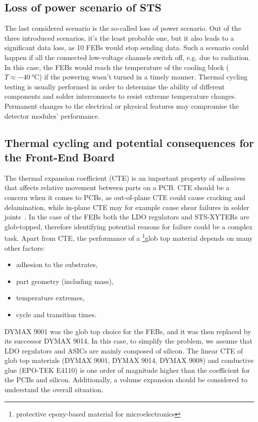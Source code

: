 \subsection{Loss of power scenario of STS}
\label{power_loss}
The last considered scenario is the so-called loss of power scenario. Out of the three introduced scenarios, it's the least probable one, but it also leads to a significant data loss, as 10 \glspl{FEB} would stop sending data. Such a scenario could happen if all the connected low-voltage channels switch off, e.g. due to radiation. In this case, the \glspl{FEB} would reach the temperature of the cooling block ($T \approx \SI{-40}{\celsius}$) if the powering wasn't turned in a timely manner.
Thermal cycling testing is usually performed in order to determine the ability of different components and solder interconnects to resist extreme temperature changes. Permanent changes to the electrical or physical features may compromise the detector modules' performance. 
\subsection{Thermal cycling and potential consequences for the Front-End Board}

The thermal expansion coefficient (\gls{CTE}) is an important property of adhesives that affects relative movement between parts on a \gls{PCB}. \gls{CTE} should be a concern when it comes to \glspl{PCB}, as out-of-plane \gls{CTE} could cause cracking and delamination, while in-plane \gls{CTE} may for example cause shear failures in solder joints~\cite{cte_report}. In the case of the \glspl{FEB} both the \gls{LDO} regulators and STS-XYTERs are glob-topped, therefore identifying potential reasons for failure could be a complex task. Apart from \gls{CTE}, the performance of a \footnote{protective epoxy-based material for microelectronics}{glob top} material depends on many other factors:
\begin{itemize}
    \item adhesion to the substrates,
    \item part geometry (including mass),
    \item temperature extremes,
    \item cycle and transition times.
\end{itemize}
DYMAX 9001 was the glob top choice for the \glspl{FEB}, and it was then replaced by its successor DYMAX 9014. In this case, to simplify the problem, we assume that \gls{LDO} regulators and \glspl{ASIC} are mainly composed of silicon. The linear CTE of glob top materials (DYMAX 9001, DYMAX 9014, DYMAX 9008) and conductive glue (EPO-TEK E4110) is one order of magnitude higher than the coefficient for the \glspl{PCB} and silicon. Additionally, a volume expansion should be considered to understand the overall situation.

